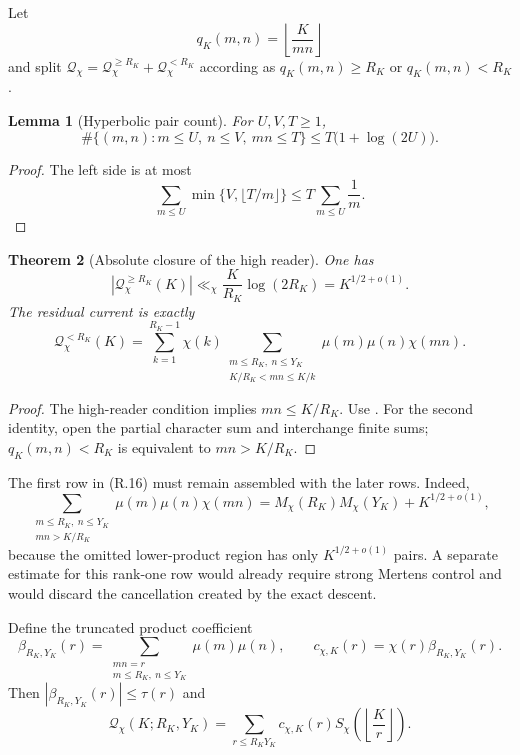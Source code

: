 \documentclass[11pt]{article}
\newtheorem{theorem}{Theorem}[section]
\newtheorem{lemma}[theorem]{Lemma}
\theoremstyle{definition}
\theoremstyle{remark}
\newcommand{\abs}[1]{\left\lvert#1\right\rvert}
\begin{document}
Let
\[
 q_K(m,n)=\left\lfloor\frac{K}{mn}\right\rfloor
\]
and split $\mathcal Q_\chi=\mathcal Q_\chi^{\ge R_K}
+\mathcal Q_\chi^{<R_K}$ according as $q_K(m,n)\ge R_K$ or $q_K(m,n)<R_K$.

\begin{lemma}[Hyperbolic pair count]
\label{lem:rectangular-pair-count}
For $U,V,T\ge1$,
\[
 \#\{(m,n):m\le U,\ n\le V,\ mn\le T\}
 \le T\bigl(1+\log(2U)\bigr).
 \tag{R.14}
\]
\end{lemma}

\begin{proof}
The left side is at most
\[
 \sum_{m\le U}\min\{V,\lfloor T/m\rfloor\}
 \le T\sum_{m\le U}\frac1m.
\]
\end{proof}

\begin{theorem}[Absolute closure of the high reader]
\label{thm:rectangular-high-reader}
One has
\[
 \boxed{
 \abs{\mathcal Q_\chi^{\ge R_K}(K)}
 \ll_\chi\frac{K}{R_K}\log(2R_K)
 =K^{1/2+o(1)}.}
 \tag{R.15}
\]
The residual current is exactly
\[
 \boxed{
 \mathcal Q_\chi^{<R_K}(K)
 =\sum_{k=1}^{R_K-1}\chi(k)
   \sum_{\substack{m\le R_K,\ n\le Y_K\\
                   K/R_K<mn\le K/k}}
   \mu(m)\mu(n)\chi(mn).}
 \tag{R.16}
\]
\end{theorem}

\begin{proof}
The high-reader condition implies $mn\le K/R_K$.  Use
.  For the
second identity, open the partial character sum and interchange finite sums;
$q_K(m,n)<R_K$ is equivalent to $mn>K/R_K$.
\end{proof}

The first row in \textup{(R.16)} must remain assembled with the later rows.
Indeed,
\[
 \sum_{\substack{m\le R_K,\ n\le Y_K\\mn>K/R_K}}
 \mu(m)\mu(n)\chi(mn)
 =M_\chi(R_K)M_\chi(Y_K)+K^{1/2+o(1)},
 \tag{R.17}
\]
because the omitted lower-product region has only $K^{1/2+o(1)}$ pairs.  A
separate estimate for this rank-one row would already require strong Mertens
control and would discard the cancellation created by the exact descent.

Define the truncated product coefficient
\[
 \beta_{R_K,Y_K}(r)
 =\sum_{\substack{mn=r\\m\le R_K,\ n\le Y_K}}\mu(m)\mu(n),
 \qquad
 c_{\chi,K}(r)=\chi(r)\beta_{R_K,Y_K}(r).
 \tag{R.18}
\]
Then $|\beta_{R_K,Y_K}(r)|\le\tau(r)$ and
\[
 \boxed{
 \mathcal Q_\chi(K;R_K,Y_K)
 =\sum_{r\le R_KY_K}c_{\chi,K}(r)
 S_\chi\!\left(\left\lfloor\frac{K}{r}\right\rfloor\right).}
 \tag{R.19}
\]
\end{document}
